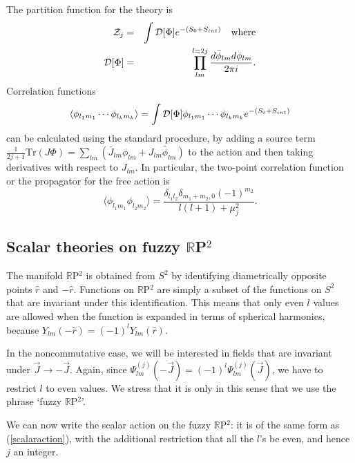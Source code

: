 \documentclass[a4paper,12pt]{article}
\numberwithin{equation}{section}
\begin{document}
The partition function for the theory is
\begin{eqnarray} 
{\cal Z}_j &=& \int {\cal D}[\Phi]e^{-(S_0 + S_{int})} \quad \text{where} \\
{\cal D}[\Phi] &=& \prod_{lm}^{l=2j} \frac{d\bar{\phi}_{lm} d
\phi_{lm}}{2 \pi i}.
\end{eqnarray}
Correlation functions 
\begin{equation} 
\langle \phi_{l_1 m_1}\cdots \phi_{l_k m_k} \rangle = \int {\cal
D}[\Phi] \phi_{l_1 m_1}\cdots \phi_{l_k m_k}  e^{-(S_0 + S_{int})}
\end{equation} 
can be calculated using the standard procedure, by adding a source
term $\frac{1}{2j+1} \text{Tr} (J \Phi) = \sum_{lm} (\bar{J}_{lm}
\phi_{lm} + J_{lm} \bar{\phi}_{lm})$ to the action and then taking
derivatives with respect to $J_{lm}$. In particular, the two-point
correlation function or the propagator for the free action is
\begin{equation} 
\langle \phi_{l_1 m_1} \phi_{l_2 m_2}\rangle = \frac{\delta_{l_1 l_2}
\delta_{m_1 + m_2, 0}(-1)^{m_2}}{l(l+1) + \mu_j^2}.
\label{prop}
\end{equation} 

\subsection{Scalar theories on fuzzy ${\mathbb R}$P$^2$}
The manifold ${\mathbb R}$P$^2$ is obtained from $S^2$ by identifying
diametrically opposite points $\hat{r}$ and $-\hat{r}$. Functions on
${\mathbb R}$P$^2$ are simply a subset of the functions on $S^2$ that are
invariant under this identification. This means that only even $l$
values are allowed when the function is expanded in terms of spherical
harmonics, because $Y_{lm}(-\hat{r})=(-1)^l Y_{lm}(\hat{r})$. 

In the noncommutative case, we will be interested in fields that are
invariant under $\vec{J} \rightarrow -\vec{J}$. Again, since
$\Psi^{(j)}_{lm}(-\vec{J}) = (-1)^l \Psi^{(j)}_{lm}(\vec{J})$, we have
to restrict $l$ to even values. We stress that it is only in this
sense that we use the phrase `fuzzy ${\mathbb R}$P$^2$'.

We can now write the scalar action on the fuzzy ${\mathbb R}$P$^2$: it
is of the same form as (\ref{scalaraction}), with the additional
restriction that all the $l$'s be even, and hence $j$ an integer.
\end{document}
